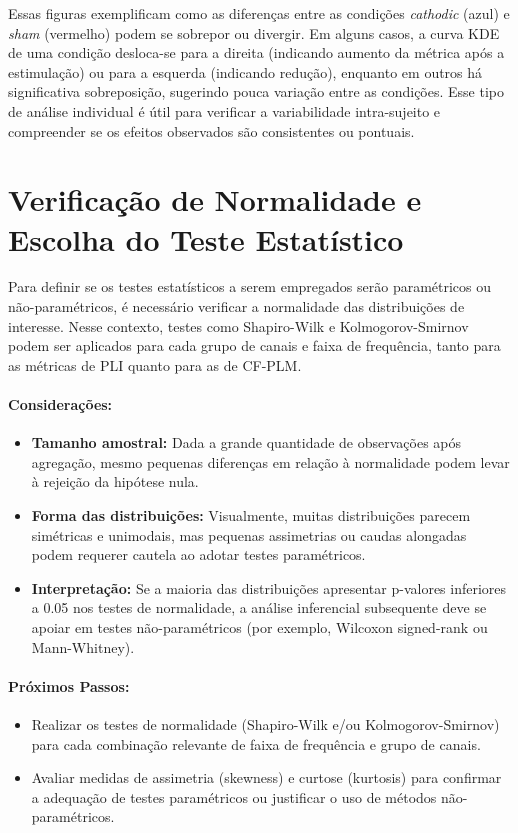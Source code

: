 Essas figuras exemplificam como as diferenças entre as condições \emph{cathodic} (azul) e \emph{sham} (vermelho) podem se sobrepor ou divergir. Em alguns casos, a curva KDE de uma condição desloca-se para a direita (indicando aumento da métrica após a estimulação) ou para a esquerda (indicando redução), enquanto em outros há significativa sobreposição, sugerindo pouca variação entre as condições. Esse tipo de análise individual é útil para verificar a variabilidade intra-sujeito e compreender se os efeitos observados são consistentes ou pontuais.

\section{Verificação de Normalidade e Escolha do Teste Estatístico}
Para definir se os testes estatísticos a serem empregados serão paramétricos ou não-paramétricos, é necessário verificar a normalidade das distribuições de interesse. Nesse contexto, testes como Shapiro-Wilk e Kolmogorov-Smirnov podem ser aplicados para cada grupo de canais e faixa de frequência, tanto para as métricas de PLI quanto para as de CF-PLM.

\paragraph{Considerações:}
\begin{itemize}
    \item \textbf{Tamanho amostral:} Dada a grande quantidade de observações após agregação, mesmo pequenas diferenças em relação à normalidade podem levar à rejeição da hipótese nula.
    \item \textbf{Forma das distribuições:} Visualmente, muitas distribuições parecem simétricas e unimodais, mas pequenas assimetrias ou caudas alongadas podem requerer cautela ao adotar testes paramétricos.
    \item \textbf{Interpretação:} Se a maioria das distribuições apresentar p-valores inferiores a 0.05 nos testes de normalidade, a análise inferencial subsequente deve se apoiar em testes não-paramétricos (por exemplo, Wilcoxon signed-rank ou Mann-Whitney).
\end{itemize}

\paragraph{Próximos Passos:}
\begin{itemize}
    \item Realizar os testes de normalidade (Shapiro-Wilk e/ou Kolmogorov-Smirnov) para cada combinação relevante de faixa de frequência e grupo de canais.
    \item Avaliar medidas de assimetria (skewness) e curtose (kurtosis) para confirmar a adequação de testes paramétricos ou justificar o uso de métodos não-paramétricos.
\end{itemize}

